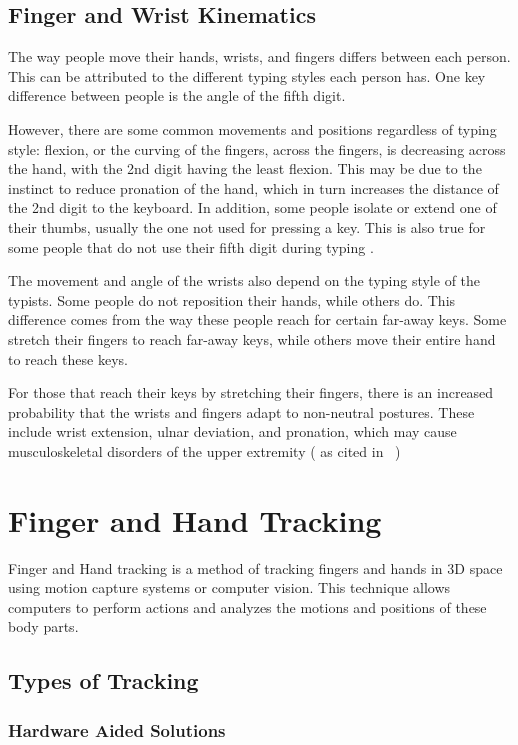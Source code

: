 \documentclass{report}
\begin{document}
\subsection{Finger and Wrist Kinematics}
The way people move their hands, wrists, and fingers differs between each
person. This can be attributed to the different typing styles each person has.
One key difference between people is the angle of the fifth digit.

However, there are some common movements and positions regardless of typing
style: flexion, or the curving of the fingers, across the fingers, is decreasing
across the hand, with the 2nd digit having the least flexion. This may be due to
the instinct to reduce pronation of the hand, which in turn increases the
distance of the 2nd digit to the keyboard. In addition, some people isolate or
extend one of their thumbs, usually the one not used for pressing a key. This is
also true for some people that do not use their fifth digit during typing
\parencite{baker2007}.

The movement and angle of the wrists also depend on the typing style of the
typists. Some people do not reposition their hands, while others do. This
difference comes from the way these people reach for certain far-away keys. Some
stretch their fingers to reach far-away keys, while others move their entire
hand to reach these keys.

For those that reach their keys by stretching their fingers, there is an
increased probability that the wrists and fingers adapt to non-neutral postures.
These include wrist extension, ulnar deviation, and pronation, which may cause
musculoskeletal disorders of the upper extremity (\textcite{marklin1999} as cited in
~\textcite{baker2007})

\section{Finger and Hand Tracking}
Finger and Hand tracking is a method of tracking fingers and hands in 3D space
using motion capture systems or computer vision. This technique allows computers
to perform actions and analyzes the motions and positions of these body parts.


\subsection{Types of Tracking}

\subsubsection{Hardware Aided Solutions}
\end{document}
